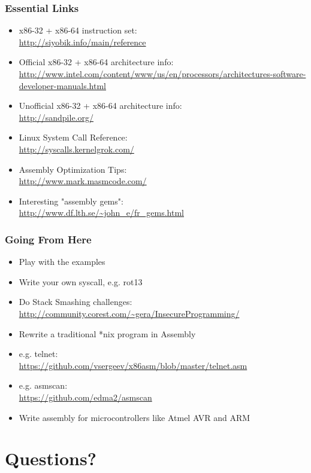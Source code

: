 \documentclass[11pt,xcolor=dvipsnames]{beamer}
\begin{document}
\begin{frame}[fragile,t]
\frametitle{Essential Links}
\begin{itemize}
  \item x86-32 + x86-64 instruction set: \\ \url{http://siyobik.info/main/reference}
  \item Official x86-32 + x86-64 architecture info: \\ \url{http://www.intel.com/content/www/us/en/processors/architectures-software-developer-manuals.html}
  \item Unofficial x86-32 + x86-64 architecture info: \\ \url{http://sandpile.org/}
  \item Linux System Call Reference: \\ \url{http://syscalls.kernelgrok.com/}
  \item Assembly Optimization Tips: \\ \url{http://www.mark.masmcode.com/}
  \item Interesting "assembly gems": \\ \url{http://www.df.lth.se/~john\_e/fr\_gems.html}
\end{itemize}
\end{frame}

\begin{frame}[fragile,t]
\frametitle{Going From Here}
\begin{itemize}
  \item Play with the examples
  \item Write your own syscall, e.g. rot13
  \item Do Stack Smashing challenges: \\ \url{http://community.corest.com/~gera/InsecureProgramming/}
  \item Rewrite a traditional *nix program in Assembly
  \item e.g. telnet: \\ {\small \url{https://github.com/vsergeev/x86asm/blob/master/telnet.asm}}
  \item e.g. asmscan: \\ {\small \url{https://github.com/edma2/asmscan}}
  \item Write assembly for microcontrollers like Atmel AVR and ARM
\end{itemize}
\end{frame}

\section*{Questions?}
\end{document}
